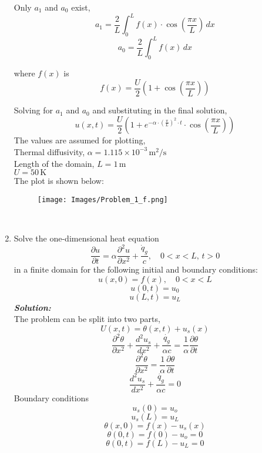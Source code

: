 \documentclass[]{article}
\theoremstyle{definition}
\begin{document}
\begin{enumerate}
Only \(a_1\) and \(a_0\) exist,
\[
a_1 = \frac{2}{L} \int_{0}^{L} f(x) \cdot \cos\left(\frac{\pi x}{L}\right) \,dx
\]
\[
a_0 = \frac{2}{L} \int_{0}^{L} f(x) \,dx
\]

where \(f(x)\) is
\[
f(x) = \frac{U}{2} \left(1 + \cos\left(\frac{\pi x}{L}\right)\right)
\]

Solving for \(a_1\) and \(a_0\) and substituting in the final solution,
\[
\boxed{
u(x,t) = \frac{U}{2} \left(1 + e^{-\alpha \cdot \left(\frac{\pi}{L}\right)^2 \cdot t} \cdot \cos\left(\frac{\pi x}{L}\right)\right)
}
\]
The values are assumed for plotting, \\
Thermal diffusivity, $\alpha = 1.115 \times 10^{-3}\, \text{m}^2/\text{s}$ \\
Length of the domain, $L = 1\, \text{m}$ \\
$U = 50\, \text{K}$ \\
The plot is shown below:\\
\begin{figure}[htbp]
    \centering
    \texttt{[image: Images/Problem\_1\_f.png]}
\end{figure}\\
\item 
Solve the one-dimensional heat equation
\[
\frac{\partial u}{\partial t} = \alpha \frac{\partial^2 u}{\partial x^2} + \frac{\dot{q}_g}{c}, \quad 0 < x < L, \, t > 0
\]
in a finite domain for the following initial and boundary conditions:
\[
u(x,0) = f(x), \quad 0 < x < L
\]
\[
u(0,t) = u_0
\]
\[
u(L,t) = u_L
\]
\emph{\textbf{Solution:}}\\
The problem can be split into two parts,
\[
U(x, t) = \theta(x, t) + u_s(x)
\]
\[
\frac{\partial^2 \theta}{\partial x^2} + \frac{d^2 u_s}{dx^2} + \frac{\dot{q_g}}{\alpha c} = \frac{1}{\alpha}\frac{\partial\theta}{\partial t}
\]
\[
\frac{\partial^{2}\theta}{\partial x^{2}} = \frac{1}{\alpha} \frac{\partial\theta}{\partial t}
\]
\[
\frac{d^{2} u_s}{dx^{2}} + \frac{\dot{q_g}}{\alpha c} = 0
\]
Boundary conditions
\[
u_s(0) = u_o
\]
\[
u_s(L) = u_L
\]
\[
\theta(x,0) = f(x) - u_s(x)
\]
\[
\theta(0,t) = f(0) - u_o = 0
\]
\[
\theta(0,t) = f(L) - u_L = 0
\]


\end{enumerate}
\end{document}

